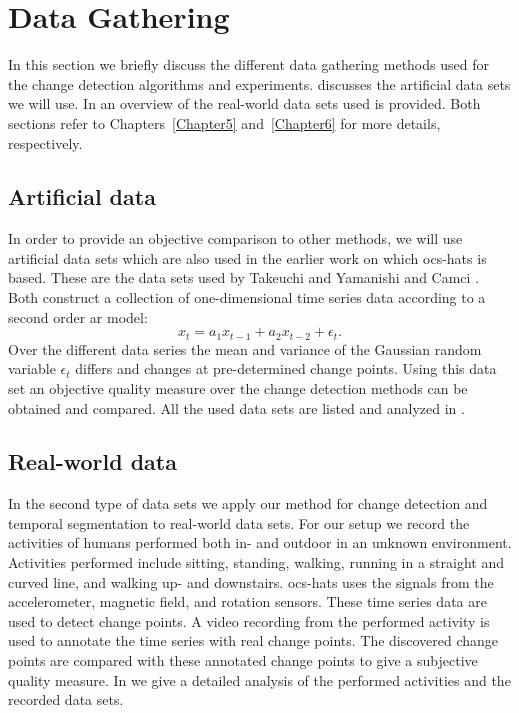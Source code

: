 \section{Data Gathering}\label{sec:method_data_gathering}
In this section we briefly discuss the different data gathering methods used for the change detection algorithms and experiments.
 discusses the artificial data sets we will use.
In  an overview of the real-world data sets used is provided.
Both sections refer to Chapters~\ref{Chapter5} and~\ref{Chapter6} for more details, respectively.

\subsection{Artificial data}\label{subsec:data_gathering_artificial}
In order to provide an objective comparison to other methods, we will use artificial data sets which are also used in the earlier work on which \gls{ocs-hats} is based.
These are the data sets used by Takeuchi and Yamanishi \cite{takeuchi2006unifying} and Camci \cite{camci2010change}.
Both construct a collection of one-dimensional time series data according to a second order \gls{ar} model:
\begin{equation}
  x_t = a_1 x_{t-1} + a_2 x_{t-2} + \epsilon_t.
\end{equation}
Over the different data series the mean and variance of the Gaussian random variable $\epsilon_t$ differs and changes at pre-determined change points.
Using this data set an objective quality measure over the change detection methods can be obtained and compared.
All the used data sets are listed and analyzed in .

\subsection{Real-world data}\label{subsec:data_gathering_real_world}
In the second type of data sets we apply our method for change detection and temporal segmentation to real-world data sets.
For our setup we record the activities of humans performed both in- and outdoor in an unknown environment.
Activities performed include sitting, standing, walking, running in a straight and curved line, and walking up- and downstairs.
\gls{ocs-hats} uses the signals from the accelerometer, magnetic field, and rotation sensors.
These time series data are used to detect change points.
A video recording from the performed activity is used to annotate the time series with real change points.
The discovered change points are compared with these annotated change points to give a subjective quality measure.
In  we give a detailed analysis of the performed activities and the recorded data sets.

